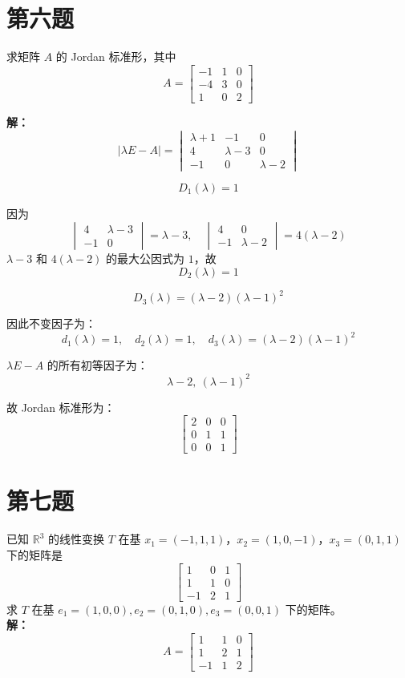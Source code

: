 \documentclass{article}
\begin{document}
\newpage
\section{第六题}\noindent
求矩阵 $A$ 的 Jordan 标准形，其中
\[
A = \begin{bmatrix}
-1 & 1 & 0 \\
-4 & 3 & 0 \\
1 & 0 & 2
\end{bmatrix}
\]

\textbf{解：}
\[
|\lambda E - A| = 
\begin{vmatrix}
\lambda + 1 & -1 & 0 \\
4 & \lambda - 3 & 0 \\
-1 & 0 & \lambda - 2
\end{vmatrix}
\]

\[
D_1(\lambda) = 1
\]

因为
\[
\begin{vmatrix}
4 & \lambda - 3 \\
-1 & 0
\end{vmatrix}
= \lambda - 3,
\quad
\begin{vmatrix}
4 & 0 \\
-1 & \lambda - 2
\end{vmatrix}
= 4(\lambda - 2)
\]
$\lambda-3$ 和 $4(\lambda-2)$ 的最大公因式为 $1$，故
\[
D_2(\lambda) = 1
\]

\[
D_3(\lambda) = (\lambda - 2)(\lambda - 1)^2
\]

因此不变因子为：
\[
d_1(\lambda) = 1,\quad d_2(\lambda) = 1,\quad d_3(\lambda) = (\lambda - 2)(\lambda - 1)^2
\]

$\lambda E - A$ 的所有初等因子为：
\[
\lambda - 2,\ (\lambda - 1)^2
\]

故 Jordan 标准形为：
\[
\begin{bmatrix}
2 & 0 & 0 \\
0 & 1 & 1 \\
0 & 0 & 1
\end{bmatrix}
\]


\newpage
\section{第七题}\noindent
已知 $\mathbb{R}^3$ 的线性变换 $T$ 在基 $x_1=(-1,1,1)$，$x_2=(1,0,-1)$，$x_3=(0,1,1)$ 下的矩阵是
\[
\begin{bmatrix}
1 & 0 & 1 \\
1 & 1 & 0 \\
-1 & 2 & 1
\end{bmatrix}
\]
求 $T$ 在基 $e_1=(1,0,0), e_2=(0,1,0), e_3=(0,0,1)$ 下的矩阵。\\
\textbf{解：}
\[
A = \begin{bmatrix}
1 & 1 & 0 \\
1 & 2 & 1 \\
-1 & 1 & 2
\end{bmatrix}
\]
\end{document}

